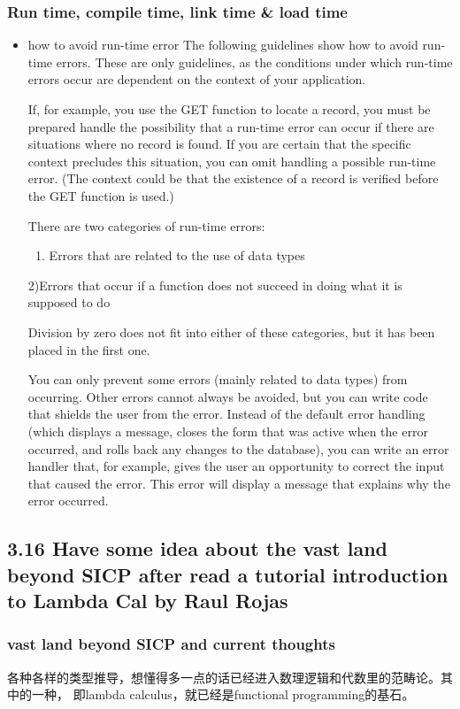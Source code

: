 \documentclass[11pt]{article}
\begin{document}
\subsubsection*{Run time, compile time, link time \& load time}
\label{sec:orgheadline148}
\begin{itemize}
\item how to avoid run-time error
\label{sec:orgheadline147}
The following guidelines show how to avoid run-time errors. These are only
guidelines, as the conditions under which run-time errors occur are dependent on
the context of your application.

If, for example, you use the GET function to locate a record, you must be
prepared handle the possibility that a run-time error can occur if there are
situations where no record is found. If you are certain that the specific
context precludes this situation, you can omit handling a possible run-time
error. (The context could be that the existence of a record is verified before
the GET function is used.)

There are two categories of run-time errors:
\begin{enumerate}
\item Errors that are related to the use of data types
\end{enumerate}

2)Errors that occur if a function does not succeed in doing what it is supposed
to do

Division by zero does not fit into either of these categories, but it has been
placed in the first one.

You can only prevent some errors (mainly related to data types) from occurring.
Other errors cannot always be avoided, but you can write code that shields the
user from the error. Instead of the default error handling (which displays a
message, closes the form that was active when the error occurred, and rolls back
any changes to the database), you can write an error handler that, for example,
gives the user an opportunity to correct the input that caused the error. This
error will display a message that explains why the error occurred.
\end{itemize}
\subsection*{3.16 Have some idea about the vast land beyond \textbf{SICP} after read a tutorial introduction to Lambda Cal by \textbf{Raul Rojas}}
\label{sec:orgheadline155}
\subsubsection*{vast land beyond SICP and current thoughts}
\label{sec:orgheadline150}
各种各样的类型推导，想懂得多一点的话已经进入数理逻辑和代数里的范畴论。其中的一种，
即lambda calculus，就已经是functional programming的基石。
\end{document}
